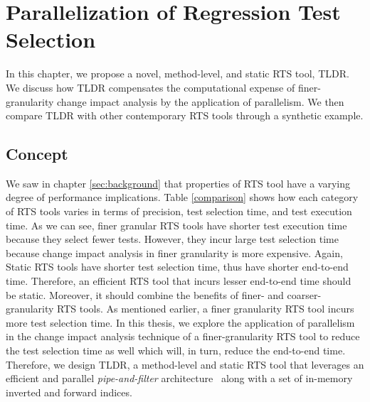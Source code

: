 \chapter{Parallelization of Regression Test Selection }
\label{sec:tldr}

In this chapter, we propose a novel, method-level, and static RTS tool, TLDR. We discuss how TLDR compensates the computational expense of finer-granularity change impact analysis by the application of parallelism. We then compare TLDR with other contemporary RTS tools through a synthetic example. 

\section{Concept}
We saw in chapter \ref{sec:background} that properties of RTS tool have a varying degree of performance implications. Table \ref{comparison} shows how each category of RTS tools varies in terms of precision, test selection time, and test execution time. As we can see, finer granular RTS tools have shorter test execution time because they select fewer tests. However, they incur large test selection time because change impact analysis in finer granularity is more expensive. Again, Static RTS tools have shorter test selection time, thus have shorter end-to-end time. Therefore, an efficient RTS tool that incurs lesser end-to-end time should be static. Moreover, it should combine the benefits of finer- and coarser-granularity RTS tools. As mentioned earlier, a finer granularity RTS tool incurs more test selection time. In this thesis, we explore the application of parallelism in the change impact analysis technique of a finer-granularity RTS tool to reduce the test selection time as well which will, in turn, reduce the end-to-end time. Therefore, we design TLDR, a method-level and static RTS tool that leverages an efficient and parallel \textit{pipe-and-filter} architecture~\cite{gokhale2006reliability, philipps1999refinement} along with a set of in-memory inverted and forward indices. 

